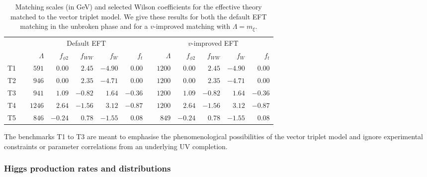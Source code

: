 \begin{table}
  \begin{tabular}{c c rrrrr c rrrrr}
    \toprule
    \multirow{2}{*}{} && \multicolumn{5}{c}{Default EFT}
    && \multicolumn{5}{c}{$v$-improved EFT} \\
    \cmidrule{3-7} \cmidrule{9-13}
    && $\Lambda$ & $f_{\phi 2}$ & $f_{WW}$ & $f_W$ & $f_{t}$
    && $\Lambda$ & $f_{\phi 2}$ & $f_{WW}$ & $f_W$ & $f_{t}$\\
    \midrule
    T1 && $591$ & $0.00$ & $2.45$ & $-4.90$ & $0.00$ 
        && $1200$ & $0.00$ & $2.45$ & $-4.90$ & $0.00$ \\
    T2 && $946$ & $0.00$ & $2.35$ & $-4.71$ & $0.00$
         && $1200$ & $0.00$ & $2.35$ & $-4.71$ & $0.00$ \\
    T3 && $941$ & $1.09$ & $-0.82$ & $1.64$ & $-0.36$ 
         && $1200$ & $1.09$ & $-0.82$ & $1.64$ & $-0.36$  \\
    T4 && $1246$ & $2.64$ & $-1.56$ & $3.12$ & $-0.87$
         && $1200$ & $2.64$ & $-1.56$ & $3.12$ & $-0.87$ \\
    T5 && $846$ & $-0.24$ & $0.78$ & $-1.55$ & $0.08$ 
         && $849$ & $-0.24$ & $0.78$ & $-1.55$ & $0.08$ \\
    \bottomrule
    \end{tabular}
    \caption[EFT description for the vector triplet benchmarks]{Matching
      scales (in GeV) and selected Wilson coefficients for the effective
      theory matched to the vector triplet model. We give these results 
      for both the default EFT matching in the unbroken phase and for a
      $v$-improved matching with $\Lambda = m_{\xi}$.}
  \label{tbl:validity_vector_triplet_eft}
\end{table}

The benchmarks T1 to T3 are meant to emphasise the phenomenological
possibilities of the vector triplet model and ignore experimental
constraints or parameter correlations from an underlying UV
completion.



\subsubsection{Higgs production rates and distributions}


